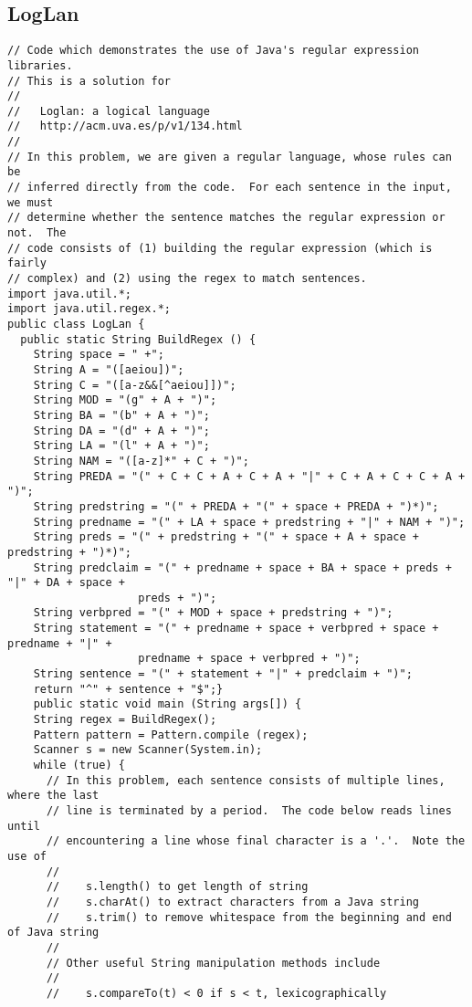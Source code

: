 \documentclass[8pt, oneside]{extarticle}
\begin{document}
\begin{multicols}{3}
\subsection{LogLan}
\begin{lstlisting}
// Code which demonstrates the use of Java's regular expression libraries.
// This is a solution for 
//
//   Loglan: a logical language
//   http://acm.uva.es/p/v1/134.html
//
// In this problem, we are given a regular language, whose rules can be
// inferred directly from the code.  For each sentence in the input, we must
// determine whether the sentence matches the regular expression or not.  The
// code consists of (1) building the regular expression (which is fairly
// complex) and (2) using the regex to match sentences.
import java.util.*;
import java.util.regex.*;
public class LogLan {
  public static String BuildRegex () {
    String space = " +";
    String A = "([aeiou])";
    String C = "([a-z&&[^aeiou]])";
    String MOD = "(g" + A + ")";
    String BA = "(b" + A + ")";
    String DA = "(d" + A + ")";
    String LA = "(l" + A + ")";
    String NAM = "([a-z]*" + C + ")";
    String PREDA = "(" + C + C + A + C + A + "|" + C + A + C + C + A + ")";
    String predstring = "(" + PREDA + "(" + space + PREDA + ")*)";
    String predname = "(" + LA + space + predstring + "|" + NAM + ")";
    String preds = "(" + predstring + "(" + space + A + space + predstring + ")*)";
    String predclaim = "(" + predname + space + BA + space + preds + "|" + DA + space +
                    preds + ")";
    String verbpred = "(" + MOD + space + predstring + ")";
    String statement = "(" + predname + space + verbpred + space + predname + "|" + 
                    predname + space + verbpred + ")";
    String sentence = "(" + statement + "|" + predclaim + ")";
    return "^" + sentence + "$";}
    public static void main (String args[]) {
    String regex = BuildRegex();
    Pattern pattern = Pattern.compile (regex);
    Scanner s = new Scanner(System.in);
    while (true) {
      // In this problem, each sentence consists of multiple lines, where the last 
      // line is terminated by a period.  The code below reads lines until
      // encountering a line whose final character is a '.'.  Note the use of
      //
      //    s.length() to get length of string
      //    s.charAt() to extract characters from a Java string
      //    s.trim() to remove whitespace from the beginning and end of Java string
      //
      // Other useful String manipulation methods include
      //
      //    s.compareTo(t) < 0 if s < t, lexicographically

\end{lstlisting}
\end{multicols}
\end{document}
